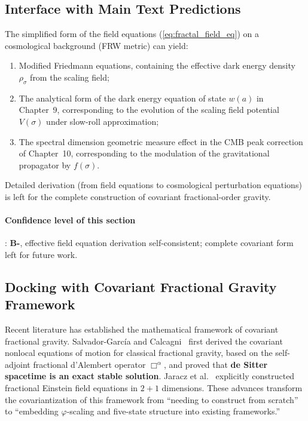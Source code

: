 \documentclass[12pt,a4paper,twocolumn]{article}
\renewcommand{\phi}{\varphi}
\begin{document}
\subsection{Interface with Main Text Predictions}
The simplified form of the field equations (\ref{eq:fractal_field_eq}) on a cosmological background (FRW metric) can yield:
\begin{enumerate}
\item Modified Friedmann equations, containing the effective dark energy density $\rho_\sigma$ from the scaling field;
\item The analytical form of the dark energy equation of state $w(a)$ in Chapter~9, corresponding to the evolution of the scaling field potential $V(\sigma)$ under slow-roll approximation;
\item The spectral dimension geometric measure effect in the CMB peak correction of Chapter~10, corresponding to the modulation of the gravitational propagator by $f(\sigma)$.
\end{enumerate}
Detailed derivation (from field equations to cosmological perturbation equations) is left for the complete construction of covariant fractional-order gravity.

\paragraph{Confidence level of this section}: \textbf{B-}, effective field equation derivation self-consistent; complete covariant form left for future work.

\subsection{Docking with Covariant Fractional Gravity Framework}
\label{subsec:covariant_docking}
\label{subsec:covariant_docking}

Recent literature has established the mathematical framework of covariant fractional gravity. Salvador-Garc\'ia and Calcagni~\cite{SalvadorGarcia2026} first derived the covariant nonlocal equations of motion for classical fractional gravity, based on the self-adjoint fractional d'Alembert operator $\Box^\alpha$, and proved that \textbf{de Sitter spacetime is an exact stable solution}. Jaracz et al.~\cite{Jaracz2025} explicitly constructed fractional Einstein field equations in $2{+}1$ dimensions. These advances transform the covariantization of this framework from ``needing to construct from scratch'' to ``embedding $\phi$-scaling and five-state structure into existing frameworks.''
\end{document}
